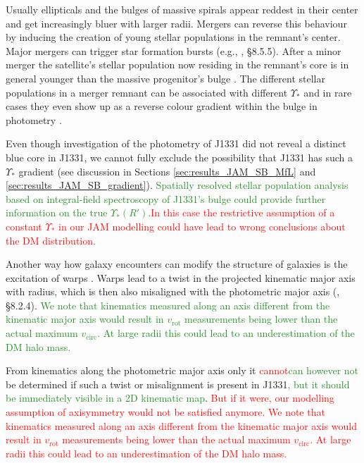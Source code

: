 \documentclass[useAMS,usenatbib]{mnras}
\newcommand{\NEW}[1]{\textcolor{ForestGreen}{#1}}
\newcommand{\OLD}[1]{\textcolor{Red}{#1}}
\begin{document}
Usually ellipticals and the bulges of massive spirals appear reddest in their center and get increasingly bluer with larger radii. Mergers can reverse this behaviour by inducing the creation of young stellar populations in the remnant's center. Major mergers can trigger star formation bursts (e.g., \citealt{2008gady.book.....B}, \S 8.5.5). After a minor merger the satellite's stellar population now residing in the remnant's core is in general younger than the massive progenitor's bulge \citep{1996AJ....112..839C,2010MNRAS.404.1775T}. The different stellar populations in a merger remnant can be associated with different $\Upsilon_*$ and in rare cases they even show up as a reverse colour gradient within the bulge in photometry \citep{1990ApJ...361..381B, 1997ApJ...481..710C}.

Even though investigation of the photometry of J1331 did not reveal a distinct blue core in J1331, we cannot fully exclude the possibility that J1331 has such a $\Upsilon_*$ gradient (see discussion in Sections \ref{sec:results_JAM_SB_MfL} and \ref{sec:results_JAM_SB_gradient}). \NEW{Spatially resolved stellar population analysis based on integral-field spectroscopy of J1331's bulge could provide further information on the true $\Upsilon_*(R')$.}\OLD{In this case the restrictive assumption of a constant $\Upsilon_*$ in our JAM modelling could have lead to wrong conclusions about the DM distribution.}

Another way how galaxy encounters can modify the structure of galaxies is the excitation of warps \citep{1991wdir.book.....C,2013pss5.book..923S}. Warps lead to a twist in the projected kinematic major axis with radius, which is then also misaligned with the photometric major axis (\citealt{1998gaas.book.....B}, \S 8.2.4). \NEW{We note that kinematics measured along an axis different from the kinematic major axis would result in $v_\text{rot}$ measurements being lower than the actual maximum $v_\text{circ}$. At large radii this could lead to an underestimation of the DM halo mass.} 

From kinematics along the photometric major axis only it \OLD{cannot}\NEW{can however not} be determined if such a twist or misalignment is present in J1331\NEW{, but it should be immediately visible in a 2D kinematic map}.\OLD{ But if it were, our modelling assumption of axisymmetry would not be satisfied anymore.} \OLD{We note that kinematics measured along an axis different from the kinematic major axis would result in $v_\text{rot}$ measurements being lower than the actual maximum $v_\text{circ}$. At large radii this could lead to an underestimation of the DM halo mass.}
\end{document}
